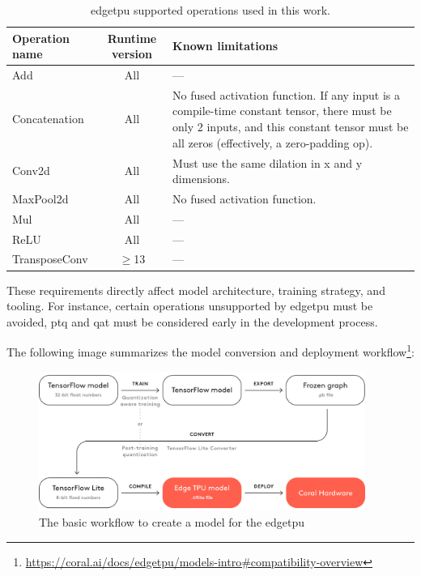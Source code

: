{\begin{table}[h]
\centering
\begin{tabularx}{\linewidth}{@{}l c X@{}}
\toprule
Operation name & Runtime version & Known limitations \\
\midrule
Add            & All  & — \\
Concatenation  & All  & No fused activation function. If any input is a compile-time constant tensor, there must be only 2 inputs, and this constant tensor must be all zeros (effectively, a zero-padding op). \\
Conv2d         & All  & Must use the same dilation in x and y dimensions. \\
MaxPool2d      & All  & No fused activation function. \\
Mul            & All  & — \\
ReLU           & All  & — \\
TransposeConv  & $\geq$13 & — \\
\bottomrule
\end{tabularx}
\caption{\gls{edgetpu} supported operations used in this work.}
\label{tab:tpuops}
\end{table}


These requirements directly affect model architecture, training strategy, and tooling. For instance, certain operations unsupported by \gls{edgetpu} must be avoided,
\gls{ptq} and \gls{qat} must be considered early in the development process.

The following image summarizes the model conversion and deployment workflow\footnote{\url{https://coral.ai/docs/edgetpu/models-intro\#compatibility-overview}}:

\begin{figure}[H]
  \centering
  \includegraphics[width=0.95\textwidth]{files/Edge_TPU_quantization.png}
  \caption{The basic workflow to create a model for the \protect\gls{edgetpu}}
  \label{fig:quantization-chart}
\end{figure}

}

